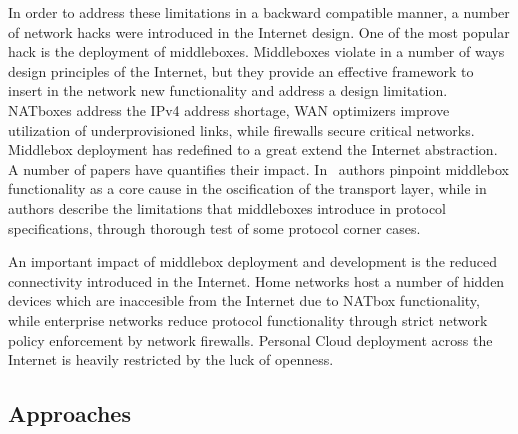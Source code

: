 In order to address these limitations in a backward compatible manner, a number
of network hacks were introduced in the Internet design. One of the most popular
hack is the deployment of middleboxes.  Middleboxes violate in a number of ways
design principles of the Internet, but they provide an effective framework to
insert in the network new functionality and address a design limitation.
NATboxes address the IPv4 address shortage, WAN optimizers improve utilization
of underprovisioned links, while firewalls secure critical networks. Middlebox
deployment has redefined to a great extend the Internet abstraction. A number of
papers have quantifies their impact.  In~\cite{Honda:2011ci} authors pinpoint
middlebox functionality as a core cause in the oscification of the transport
layer, while in~\cite{Kreibich10} authors describe the limitations that
middleboxes introduce in protocol specifications, through thorough test of some
protocol corner cases.  

An important impact of middlebox deployment and development is the reduced
connectivity introduced in the Internet. Home networks host a number of hidden
devices which are inaccesible from the Internet due to NATbox functionality,
while enterprise networks reduce protocol functionality through strict network
policy enforcement by network firewalls. Personal Cloud deployment across the
Internet is heavily restricted by the luck of openness.


\subsection{Approaches} 

